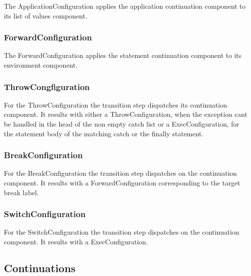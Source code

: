 \documentclass{article}
\begin{document}
The ApplicationConfiguration applies the application continuation component to its list of values component.

\subsubsection{ForwardConfiguration}
\label{subsubsec:forwardconfig}

The ForwardConfiguration applies the statement continuation component to its environment component.

\subsubsection{ThrowCongfiguration}
\label{subsubsec:throwconfig}

For the ThrowConfiguration the transition step dispatches its continuation component.  It results with either a ThrowConfiguration, when  the exception cant be handled in the head of the non empty catch list or a ExecConfiguration, for the statement body of the matching catch or the finally statement.

\subsubsection{BreakConfiguration}
\label{subsubsec:breakconfig}

For the BreakConfiguration the transition step dispatches on the continuation component. It results with a ForwardConfiguration corresponding to the target break label.

\subsubsection{SwitchConfiguration}
\label{subsubsec:switchconfig}

For the SwitchConfiguration the transition step dispatches on the continuation component. It results with a ExecConfiguration.

\subsection{Continuations}
\label{subsec:continuations-definition}

\newcommand{\expressionmeta}{\ensuremath{\mathit{E}}}
\newcommand{\expressionsmeta}{\expressionmeta{s}}
\newcommand{\variablemeta}{\ensuremath{\mathit{X}}}
\newcommand{\boolmeta}{\ensuremath{\mathit{B}}}
\newcommand{\integermeta}{\ensuremath{\mathit{I}}}
\newcommand{\doublemeta}{\ensuremath{\mathit{D}}}
\newcommand{\stringmeta}{\ensuremath{\mathit{S}}}
\newcommand{\idmeta}{\ensuremath{\mathit{X}}}
\newcommand{\membermeta}{\ensuremath{\mathit{M}}}
\newcommand{\typemeta}{\ensuremath{\mathit{T}}}
\end{document}
